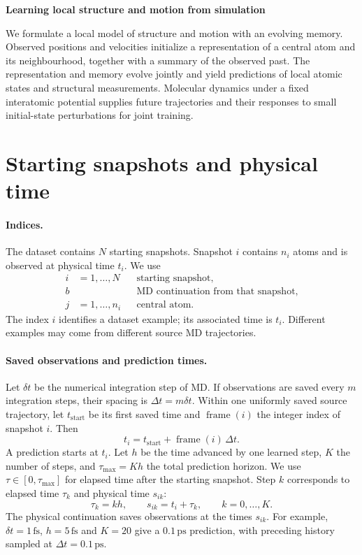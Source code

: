 \documentclass[11pt,a4paper]{article}
\begin{document}
\begin{center}
{\LARGE\bfseries Learning local structure and motion from simulation}
\end{center}
\vspace{-4pt}

We formulate a local model of structure and motion with an evolving memory.
Observed positions and velocities initialize a representation of a central
atom and its neighbourhood, together with a summary of the observed past.
The representation and memory evolve jointly and yield predictions of local
atomic states and structural measurements. Molecular dynamics under a fixed
interatomic potential supplies future trajectories and their responses to
small initial-state perturbations for joint training.

\section{Starting snapshots and physical time}

\paragraph{Indices.}
The dataset contains $N$ starting snapshots. Snapshot $i$ contains $n_i$ atoms
and is observed at physical time $t_i$. We use
\[
\begin{aligned}
i&=1,\ldots,N &&\text{starting snapshot},\\
b&&&\text{MD continuation from that snapshot},\\
j&=1,\ldots,n_i &&\text{central atom}.
\end{aligned}
\]
The index $i$ identifies a dataset example; its associated time is $t_i$.
Different examples may come from different source MD trajectories.

\paragraph{Saved observations and prediction times.}
Let $\delta t$ be the numerical integration step of MD. If observations are
saved every $m$ integration steps, their spacing is $\Delta t=m\delta t$.
Within one uniformly saved source trajectory, let $t_{\mathrm{start}}$ be its
first saved time and $\operatorname{frame}(i)$ the integer index of snapshot $i$.
Then
\[
t_i=t_{\mathrm{start}}+\operatorname{frame}(i)\,\Delta t.
\]
A prediction starts at $t_i$. Let $h$ be the time advanced by one learned
step, $K$ the number of steps, and $\tau_{\max}=Kh$ the total prediction horizon.
We use $\tau\in[0,\tau_{\max}]$ for elapsed time after the starting snapshot.
Step $k$ corresponds to elapsed time $\tau_k$ and physical time $s_{ik}$:
\[
\boxed{\tau_k=kh,\qquad s_{ik}=t_i+\tau_k,\qquad k=0,\ldots,K.}
\]
The physical continuation saves observations at the times $s_{ik}$.
For example, $\delta t=1\,\mathrm{fs}$, $h=5\,\mathrm{fs}$ and $K=20$
give a $0.1\,\mathrm{ps}$ prediction, with preceding history sampled at
$\Delta t=0.1\,\mathrm{ps}$.
\end{document}
